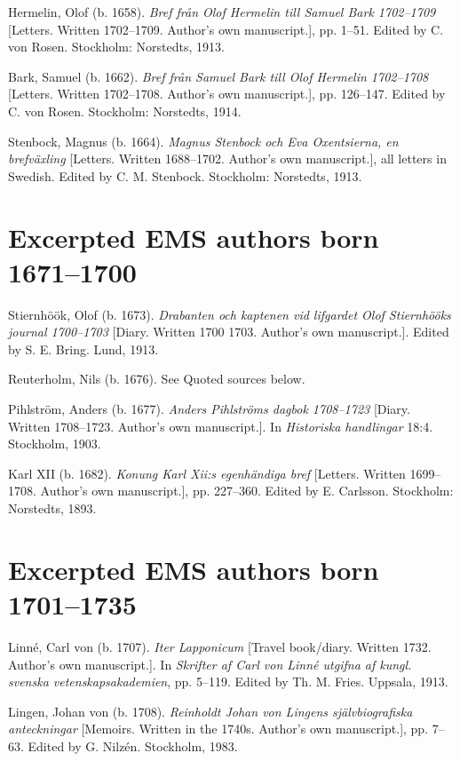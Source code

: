 \documentclass[output=paper]{langscibook}
\begin{document}
Hermelin, Olof (b. 1658). \textit{Bref från Olof Hermelin till Samuel Bark 1702–1709} [Letters. Written 1702–1709. Author’s own manuscript.], pp. 1–51. Edited by C. von Rosen. Stockholm: Norstedts, 1913.



Bark, Samuel (b. 1662). \textit{Bref från Samuel Bark till Olof Hermelin 1702–1708} [Letters. Written 1702–1708. Author’s own manuscript.], pp. 126–147. Edited by C. von Rosen. Stockholm: Norstedts, 1914.



Stenbock, Magnus (b. 1664). \textit{Magnus Stenbock och Eva Oxentsierna, en brefväxling} [Letters. Written 1688–1702. Author’s own manuscript.], all letters in Swedish. Edited by C. M. Stenbock. Stockholm: Norstedts, 1913.


\section*{Excerpted EMS authors born 1671–1700}


Stiernhöök, Olof (b. 1673). \textit{Drabanten och kaptenen vid lifgardet Olof Stiernhööks journal 1700–1703} [Diary. Written 1700 1703. Author’s own manuscript.]. Edited by S. E. Bring. Lund, 1913.



Reuterholm, Nils (b. 1676). See Quoted sources below.



Pihlström, Anders (b. 1677). \textit{Anders Pihlströms dagbok 1708–1723} [Diary. Written 1708–1723. Author’s own manuscript.]. In \textit{Historiska handlingar} 18:4. Stockholm, 1903.



Karl XII (b. 1682). \textit{Konung Karl Xii:s egenhändiga bref} [Letters. Written 1699–1708. Author’s own manuscript.], pp. 227–360. Edited by E. Carlsson. Stockholm: Norstedts, 1893.


\section*{Excerpted EMS authors born 1701–1735}


Linné, Carl von (b. 1707). \textit{Iter Lapponicum} [Travel book/diary. Written 1732. Author’s own manuscript.]. In \textit{Skrifter af Carl von Linné utgifna af kungl. svenska vetenskapsakademien}, pp. 5–119. Edited by Th. M. Fries. Uppsala, 1913.



Lingen, Johan von (b. 1708). \textit{Reinholdt Johan von Lingens självbiografiska anteckningar} [Memoirs. Written in the 1740s. Author’s own manuscript.], pp. 7–63. Edited by G. Nilzén. Stockholm, 1983.
\end{document}
